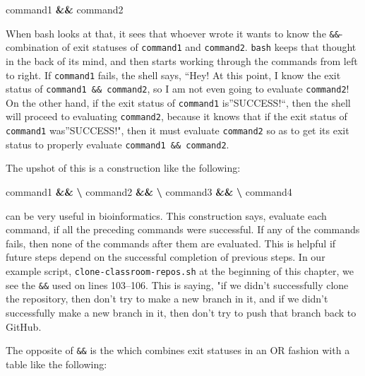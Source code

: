 \documentclass[]{krantz}
\makeatletter
\newenvironment{Shaded}{\begin{snugshade}}{\end{snugshade}}
\newcommand{\ExtensionTok}[1]{#1}
\newcommand{\KeywordTok}[1]{\textcolor[rgb]{0.27,0.27,0.27}{\textbf{#1}}}
\newenvironment{kframe}{%
\medskip{}
\setlength{\fboxsep}{.8em}
 \def\at@end@of@kframe{}%
 \ifinner\ifhmode%
  \def\at@end@of@kframe{\end{minipage}}%
  \begin{minipage}{\columnwidth}%
 \fi\fi%
 \def\FrameCommand##1{\hskip\@totalleftmargin \hskip-\fboxsep
 \colorbox{shadecolor}{##1}\hskip-\fboxsep
     \hskip-\linewidth \hskip-\@totalleftmargin \hskip\columnwidth}%
 \MakeFramed {\advance\hsize-\width
   \@totalleftmargin\z@ \linewidth\hsize
   \@setminipage}}%
 {\par\unskip\endMakeFramed%
 \at@end@of@kframe}
\renewenvironment{Shaded}{\begin{kframe}}{\end{kframe}}
\makeatother
\begin{document}
\begin{Shaded}
\begin{Highlighting}[]
\ExtensionTok{command1} \KeywordTok{&&} \ExtensionTok{command2}
\end{Highlighting}
\end{Shaded}

When bash looks at that, it sees that whoever wrote it wants to
know the \texttt{\&\&}-combination of exit statuses of \texttt{command1} and
\texttt{command2}. \texttt{bash} keeps that thought in the back of its mind,
and then starts working through the commands from left to right.
If \texttt{command1} fails, the shell says, ``Hey! At this point, I know
the exit status of \texttt{command1\ \&\&\ command2}, so I am not even going to
evaluate \texttt{command2}! On the other hand, if the exit status
of \texttt{command1} is''SUCCESS!``, then the shell will proceed to evaluating
\texttt{command2}, because it knows that if the exit status of \texttt{command1}
was''SUCCESS!", then it must evaluate \texttt{command2} so as to get its
exit status to properly evaluate \texttt{command1\ \&\&\ command2}.

The upshot of this is a construction like the following:

\begin{Shaded}
\begin{Highlighting}[]
\ExtensionTok{command1} \KeywordTok{&&} \KeywordTok{\textbackslash{}}
  \ExtensionTok{command2} \KeywordTok{&&} \KeywordTok{\textbackslash{}}
  \ExtensionTok{command3} \KeywordTok{&&} \KeywordTok{\textbackslash{}}
  \ExtensionTok{command4}
\end{Highlighting}
\end{Shaded}

can be very useful in bioinformatics. This construction says,
evaluate each command, if all the preceding commands were successful.
If any of the commands fails, then none of the commands after them are
evaluated. This is helpful if future steps depend on the successful
completion of previous steps. In our example script, \texttt{clone-classroom-repos.sh}
at the beginning of this chapter, we see the \texttt{\&\&} used on lines 103--106.
This is saying, "if we didn't successfully clone the repository, then don't
try to make a new branch in it, and if we didn't successfully make a new
branch in it, then don't try to push that branch back to GitHub.

The opposite of \texttt{\&\&} is the \texttt{\textbar{}\textbar{}} which combines exit statuses in an OR fashion
with a table like the following:
\end{document}
